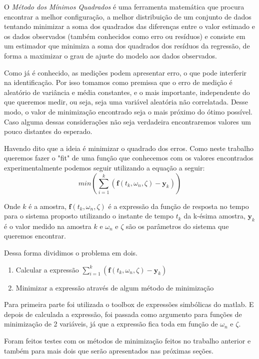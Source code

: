 O \textit{Método dos Mínimos Quadrados} é uma ferramenta matemática que procura encontrar a melhor configuração, a melhor distribuição de um conjunto de dados tentando minimizar a soma dos quadrados das diferenças entre o valor estimado e os dados observados (também conhecidos como erro ou resíduos) e consiste em um estimador que minimiza a soma dos quadrados dos resíduos da regressão, de forma a maximizar o grau de ajuste do modelo aos dados observados.

Como já é conhecido, as medições podem apresentar erro, o que pode interferir na identificação. Por isso tomamos como premissa que o erro de medição é aleatório de variância e média constantes, e o mais importante, independente do que queremos medir, ou seja, seja uma variável aleatória não correlatada. Desse modo, o valor de minimização encontrado seja o mais próximo do ótimo possível. Caso alguma dessas considerações não seja verdadeira encontraremos valores um pouco distantes do esperado.

Havendo dito que a ideia é minimizar o quadrado dos erros. Como neste trabalho queremos fazer o "fit" de uma função que conhecemos com os valores encontrados experimentalmente podemos seguir utilizando a equação a seguir:
\begin{equation}
min(\sum_{i=1}^k (\mathbf{f}(t_k,\omega_n,\zeta)-\mathbf{y}_k))
\end{equation}

Onde $k$ é a amostra, $\mathbf{f}(t_k,\omega_n,\zeta)$ é a expressão da função de resposta no tempo para o sistema proposto utilizando o instante de tempo $t_k$ da k-ésima amostra, $\mathbf{y}_k$ é o valor medido na amostra $k$ e $\omega_n$ e $\zeta$ são os parâmetros do sistema que queremos encontrar.

Dessa forma dividimos o problema em dois. 
\begin{enumerate}
\item Calcular a expressão $\sum_{i=1}^k (\mathbf{f}(t_k,\omega_n,\zeta)-\mathbf{y}_k)$
\item Minimizar a expressão através de algum método de minimização
\end{enumerate}

Para primeira parte foi utilizada o toolbox de expressões simbólicas do matlab.
E depois de calculada a expressão, foi passada como argumento para funções de minimização de 2 variáveis, já que a expressão fica toda em função de $\omega_n$ e $\zeta$.

Foram feitos testes com os métodos de minimização feitos no trabalho anterior \cite{trabalho2} e também para mais dois que serão apresentados nas próximas seções.


\newpage
